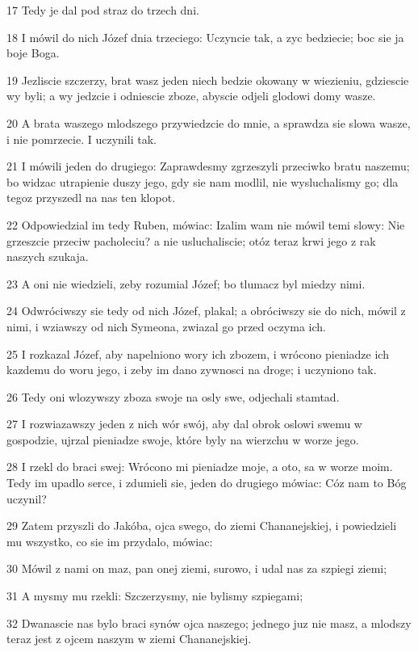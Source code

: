 \par 17 Tedy je dal pod straz do trzech dni.
\par 18 I mówil do nich Józef dnia trzeciego: Uczyncie tak, a zyc bedziecie; boc sie ja boje Boga.
\par 19 Jezliscie szczerzy, brat wasz jeden niech bedzie okowany w wiezieniu, gdziescie wy byli; a wy jedzcie i odniescie zboze, abyscie odjeli glodowi domy wasze.
\par 20 A brata waszego mlodszego przywiedzcie do mnie, a sprawdza sie slowa wasze, i nie pomrzecie. I uczynili tak.
\par 21 I mówili jeden do drugiego: Zaprawdesmy zgrzeszyli przeciwko bratu naszemu; bo widzac utrapienie duszy jego, gdy sie nam modlil, nie wysluchalismy go; dla tegoz przyszedl na nas ten klopot.
\par 22 Odpowiedzial im tedy Ruben, mówiac: Izalim wam nie mówil temi slowy: Nie grzeszcie przeciw pacholeciu? a nie usluchaliscie; otóz teraz krwi jego z rak naszych szukaja.
\par 23 A oni nie wiedzieli, zeby rozumial Józef; bo tlumacz byl miedzy nimi.
\par 24 Odwróciwszy sie tedy od nich Józef, plakal; a obróciwszy sie do nich, mówil z nimi, i wziawszy od nich Symeona, zwiazal go przed oczyma ich.
\par 25 I rozkazal Józef, aby napelniono wory ich zbozem, i wrócono pieniadze ich kazdemu do woru jego, i zeby im dano zywnosci na droge; i uczyniono tak.
\par 26 Tedy oni wlozywszy zboza swoje na osly swe, odjechali stamtad.
\par 27 I rozwiazawszy jeden z nich wór swój, aby dal obrok oslowi swemu w gospodzie, ujrzal pieniadze swoje, które byly na wierzchu w worze jego.
\par 28 I rzekl do braci swej: Wrócono mi pieniadze moje, a oto, sa w worze moim. Tedy im upadlo serce, i zdumieli sie, jeden do drugiego mówiac: Cóz nam to Bóg uczynil?
\par 29 Zatem przyszli do Jakóba, ojca swego, do ziemi Chananejskiej, i powiedzieli mu wszystko, co sie im przydalo, mówiac:
\par 30 Mówil z nami on maz, pan onej ziemi, surowo, i udal nas za szpiegi ziemi;
\par 31 A mysmy mu rzekli: Szczerzysmy, nie bylismy szpiegami;
\par 32 Dwanascie nas bylo braci synów ojca naszego; jednego juz nie masz, a mlodszy teraz jest z ojcem naszym w ziemi Chananejskiej.
